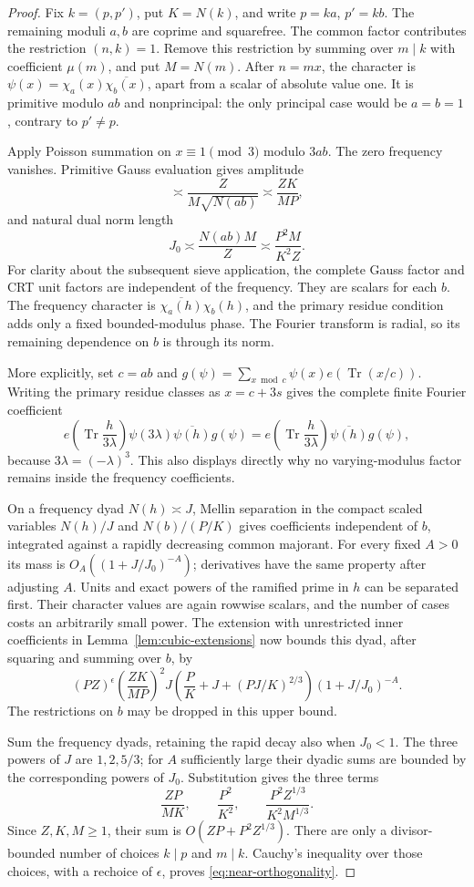 \begin{proof}
Fix $k=(p,p')$, put $K=N(k)$, and write $p=ka$, $p'=kb$.
The remaining moduli $a,b$ are coprime and squarefree.  The common
factor contributes the restriction $(n,k)=1$.  Remove this restriction
by summing over $m\mid k$ with coefficient $\mu(m)$, and put $M=N(m)$.
After $n=mx$, the character is
$\psi(x)=\chi_a(x)\overline{\chi_b(x)}$, apart from a scalar of
absolute value one.  It is primitive modulo $ab$ and nonprincipal:
the only principal case would be $a=b=1$, contrary to $p'\ne p$.

Apply Poisson summation on $x\equiv1\pmod3$ modulo $3ab$.
The zero frequency vanishes.  Primitive Gauss evaluation gives
amplitude
\[
 \asymp\frac{Z}{M\sqrt{N(ab)}}\asymp\frac{ZK}{MP},
\]
and natural dual norm length
\[
 J_0\asymp\frac{N(ab)M}{Z}
       \asymp\frac{P^2M}{K^2Z}.
\]
For clarity about the subsequent sieve application, the complete
Gauss factor and CRT unit factors are independent of the frequency.
They are scalars for each $b$.  The frequency character is
$\overline{\chi_a(h)}\chi_b(h)$, and the primary residue condition
adds only a fixed bounded-modulus phase.  The Fourier transform is
radial, so its remaining dependence on $b$ is through its norm.

More explicitly, set $c=ab$ and
$g(\psi)=\sum_{x\bmod c}\psi(x)e(\operatorname{Tr}(x/c))$.
Writing the primary residue classes as $x=c+3s$ gives the complete
finite Fourier coefficient
\[
 e\left(\operatorname{Tr}\frac{h}{3\lambda}\right)
       \psi(3\lambda)\overline{\psi(h)}g(\psi)
 =e\left(\operatorname{Tr}\frac{h}{3\lambda}\right)
       \overline{\psi(h)}g(\psi),
\]
because $3\lambda=(-\lambda)^3$. This also displays directly why
no varying-modulus factor remains inside the frequency coefficients.

On a frequency dyad $N(h)\asymp J$, Mellin separation in the compact
scaled variables $N(h)/J$ and $N(b)/(P/K)$ gives coefficients
independent of $b$, integrated against a rapidly decreasing common
majorant.  For every fixed $A>0$ its mass is
$O_A((1+J/J_0)^{-A})$; derivatives have the same property after
adjusting $A$.  Units and exact powers of the ramified prime in $h$
can be separated first.  Their character values are again rowwise
scalars, and the number of cases costs an arbitrarily small power.
The extension with unrestricted inner coefficients in
Lemma~\ref{lem:cubic-extensions} now bounds this dyad, after squaring
and summing over $b$, by
\[
 (PZ)^\epsilon
 \left(\frac{ZK}{MP}\right)^2
 J\left(\frac PK+J+(PJ/K)^{2/3}\right)
 (1+J/J_0)^{-A}.
\]
The restrictions on $b$ may be dropped in this upper bound.

Sum the frequency dyads, retaining the rapid decay also when
$J_0<1$.  The three powers of $J$ are $1,2,5/3$; for $A$ sufficiently
large their dyadic sums are bounded by the corresponding powers of
$J_0$.  Substitution gives the three terms
\[
 \frac{ZP}{MK},\qquad \frac{P^2}{K^2},\qquad
 \frac{P^2Z^{1/3}}{K^2M^{1/3}}.
\]
Since $Z,K,M\ge1$, their sum is
$O(ZP+P^2Z^{1/3})$.  There are only a divisor-bounded number of
choices $k\mid p$ and $m\mid k$.  Cauchy's inequality over those
choices, with a rechoice of $\epsilon$, proves
\eqref{eq:near-orthogonality}.
\end{proof}

